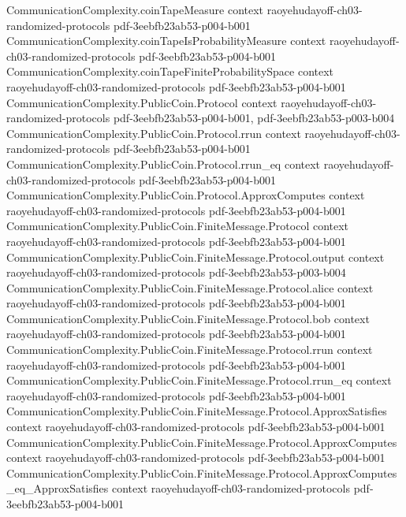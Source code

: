 \begin{theorem}
  {CommunicationComplexity.coinTapeMeasure}
  {context}
  {raoyehudayoff-ch03-randomized-protocols}
  {pdf-3eebfb23ab53-p004-b001}
\proofstep
  {CommunicationComplexity.coinTapeIsProbabilityMeasure}
  {context}
  {raoyehudayoff-ch03-randomized-protocols}
  {pdf-3eebfb23ab53-p004-b001}
\proofstep
  {CommunicationComplexity.coinTapeFiniteProbabilitySpace}
  {context}
  {raoyehudayoff-ch03-randomized-protocols}
  {pdf-3eebfb23ab53-p004-b001}
\proofstep
  {CommunicationComplexity.PublicCoin.Protocol}
  {context}
  {raoyehudayoff-ch03-randomized-protocols}
  {pdf-3eebfb23ab53-p004-b001,
    pdf-3eebfb23ab53-p003-b004}
\proofstep
  {CommunicationComplexity.PublicCoin.Protocol.rrun}
  {context}
  {raoyehudayoff-ch03-randomized-protocols}
  {pdf-3eebfb23ab53-p004-b001}
\proofstep
  {CommunicationComplexity.PublicCoin.Protocol.rrun_eq}
  {context}
  {raoyehudayoff-ch03-randomized-protocols}
  {pdf-3eebfb23ab53-p004-b001}
\proofstep
  {CommunicationComplexity.PublicCoin.Protocol.ApproxComputes}
  {context}
  {raoyehudayoff-ch03-randomized-protocols}
  {pdf-3eebfb23ab53-p004-b001}
\proofstep
  {CommunicationComplexity.PublicCoin.FiniteMessage.Protocol}
  {context}
  {raoyehudayoff-ch03-randomized-protocols}
  {pdf-3eebfb23ab53-p004-b001}
\proofstep
  {CommunicationComplexity.PublicCoin.FiniteMessage.Protocol.output}
  {context}
  {raoyehudayoff-ch03-randomized-protocols}
  {pdf-3eebfb23ab53-p003-b004}
\proofstep
  {CommunicationComplexity.PublicCoin.FiniteMessage.Protocol.alice}
  {context}
  {raoyehudayoff-ch03-randomized-protocols}
  {pdf-3eebfb23ab53-p004-b001}
\proofstep
  {CommunicationComplexity.PublicCoin.FiniteMessage.Protocol.bob}
  {context}
  {raoyehudayoff-ch03-randomized-protocols}
  {pdf-3eebfb23ab53-p004-b001}
\proofstep
  {CommunicationComplexity.PublicCoin.FiniteMessage.Protocol.rrun}
  {context}
  {raoyehudayoff-ch03-randomized-protocols}
  {pdf-3eebfb23ab53-p004-b001}
\proofstep
  {CommunicationComplexity.PublicCoin.FiniteMessage.Protocol.rrun_eq}
  {context}
  {raoyehudayoff-ch03-randomized-protocols}
  {pdf-3eebfb23ab53-p004-b001}
\proofstep
  {CommunicationComplexity.PublicCoin.FiniteMessage.Protocol.ApproxSatisfies}
  {context}
  {raoyehudayoff-ch03-randomized-protocols}
  {pdf-3eebfb23ab53-p004-b001}
\proofstep
  {CommunicationComplexity.PublicCoin.FiniteMessage.Protocol.ApproxComputes}
  {context}
  {raoyehudayoff-ch03-randomized-protocols}
  {pdf-3eebfb23ab53-p004-b001}
\proofstep
  {CommunicationComplexity.PublicCoin.FiniteMessage.Protocol.ApproxComputes_eq_ApproxSatisfies}
  {context}
  {raoyehudayoff-ch03-randomized-protocols}
  {pdf-3eebfb23ab53-p004-b001}

\end{theorem}
